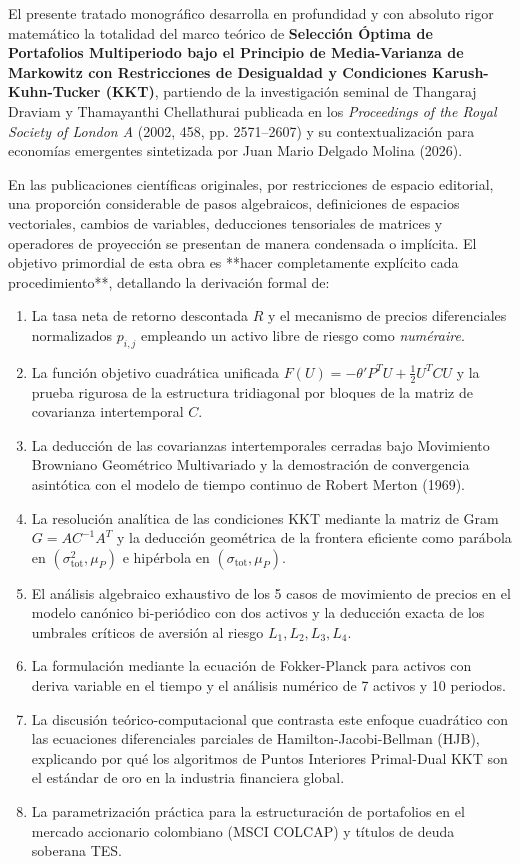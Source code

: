 \documentclass[11pt,a4paper]{report}
\numberwithin{equation}{chapter}
\begin{document}
El presente tratado monográfico desarrolla en profundidad y con absoluto rigor matemático la totalidad del marco teórico de \textbf{Selección Óptima de Portafolios Multiperiodo bajo el Principio de Media-Varianza de Markowitz con Restricciones de Desigualdad y Condiciones Karush-Kuhn-Tucker (KKT)}, partiendo de la investigación seminal de Thangaraj Draviam y Thamayanthi Chellathurai publicada en los \emph{Proceedings of the Royal Society of London A} (2002, 458, pp. 2571--2607) y su contextualización para economías emergentes sintetizada por Juan Mario Delgado Molina (2026).

En las publicaciones científicas originales, por restricciones de espacio editorial, una proporción considerable de pasos algebraicos, definiciones de espacios vectoriales, cambios de variables, deducciones tensoriales de matrices y operadores de proyección se presentan de manera condensada o implícita. El objetivo primordial de esta obra es **hacer completamente explícito cada procedimiento**, detallando la derivación formal de:
\begin{enumerate}[leftmargin=2em]
    \item La tasa neta de retorno descontada $R$ y el mecanismo de precios diferenciales normalizados $p_{i,j}$ empleando un activo libre de riesgo como \emph{numéraire}.
    \item La función objetivo cuadrática unificada $F(U) = -\theta' P^T U + \frac{1}{2} U^T C U$ y la prueba rigurosa de la estructura tridiagonal por bloques de la matriz de covarianza intertemporal $C$.
    \item La deducción de las covarianzas intertemporales cerradas bajo Movimiento Browniano Geométrico Multivariado y la demostración de convergencia asintótica con el modelo de tiempo continuo de Robert Merton (1969).
    \item La resolución analítica de las condiciones KKT mediante la matriz de Gram $G = A C^{-1} A^T$ y la deducción geométrica de la frontera eficiente como parábola en $(\sigma_{\mathrm{tot}}^2, \mu_P)$ e hipérbola en $(\sigma_{\mathrm{tot}}, \mu_P)$.
    \item El análisis algebraico exhaustivo de los 5 casos de movimiento de precios en el modelo canónico bi-periódico con dos activos y la deducción exacta de los umbrales críticos de aversión al riesgo $L_1, L_2, L_3, L_4$.
    \item La formulación mediante la ecuación de Fokker-Planck para activos con deriva variable en el tiempo y el análisis numérico de 7 activos y 10 periodos.
    \item La discusión teórico-computacional que contrasta este enfoque cuadrático con las ecuaciones diferenciales parciales de Hamilton-Jacobi-Bellman (HJB), explicando por qué los algoritmos de Puntos Interiores Primal-Dual KKT son el estándar de oro en la industria financiera global.
    \item La parametrización práctica para la estructuración de portafolios en el mercado accionario colombiano (MSCI COLCAP) y títulos de deuda soberana TES.
\end{enumerate}
\end{document}
